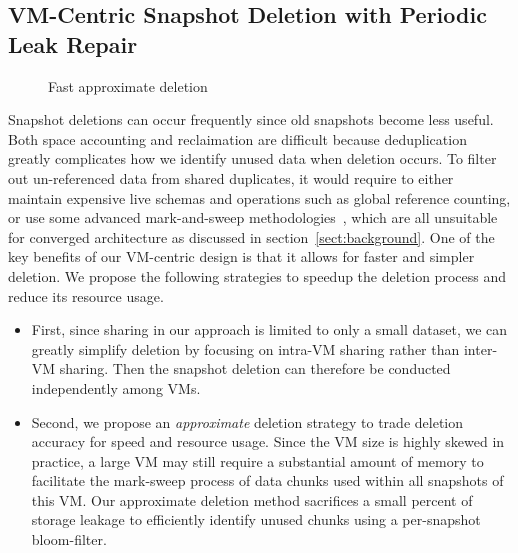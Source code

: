 
\subsection{VM-Centric Snapshot Deletion with Periodic Leak Repair}
\label{sect:delete}


\begin{figure}[htbp]
  \centering
  \caption{Fast approximate deletion}
  \label{fig:deletion_flow}
\end{figure}

Snapshot deletions can occur frequently since old snapshots become less useful.
Both space accounting and reclaimation are difficult because deduplication
greatly complicates how we identify unused data when deletion occurs.
To filter out un-referenced data from shared duplicates,
it would require to either maintain expensive live schemas and operations
such as global reference counting,
or use some advanced mark-and-sweep methodologies~\cite{Guo2011,Fabiano2013},
which are all unsuitable for converged architecture as discussed in section~\ref{sect:background}.
One of the key benefits of our VM-centric design is that it allows for faster and simpler deletion. 
We propose the following strategies to speedup the deletion process and reduce its resource usage.
\begin{itemize}
\item First, since
sharing in our approach is limited to only a small dataset, we can greatly simplify deletion by focusing
on intra-VM sharing rather than inter-VM sharing. Then the snapshot
 deletion can therefore be conducted independently among VMs.
\item Second,  we propose an {\em approximate} deletion strategy to trade deletion accuracy for speed and
resource usage. Since the VM size is highly skewed in practice,  a large VM may still require
a substantial amount of memory  to facilitate the mark-sweep process of data chunks used within all snapshots
of this VM. 
Our approximate deletion method sacrifices a small percent of storage leakage
to efficiently identify unused chunks using a per-snapshot bloom-filter.
\end{itemize}
